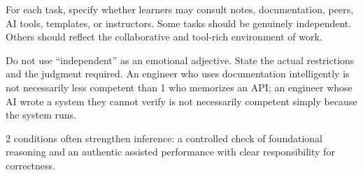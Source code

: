 For each task, specify whether learners may consult notes, documentation, peers, AI tools, templates, or instructors. Some tasks should be genuinely independent. Others should reflect the collaborative and tool-rich environment of work.

Do not use ``independent'' as an emotional adjective. State the actual restrictions and the judgment required. An engineer who uses documentation intelligently is not necessarily less competent than 1 who memorizes an API; an engineer whose AI wrote a system they cannot verify is not necessarily competent simply because the system runs.

2 conditions often strengthen inference: a controlled check of foundational reasoning and an authentic assisted performance with clear responsibility for correctness.
